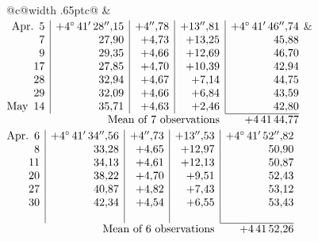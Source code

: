 \noindent\begin{tabular}{@{}c@{\hspace{.4em}\vrule width .65pt\hspace{.4em}}c@{}}
 &
 \\[.18ex]
\(\begin{array}[t]{@{}r|r|r|r|r@{}}
\text{Apr.}\enspace 5 & +4^\circ\,41'\,28''{,}15 & +4''{,}78 & +13''{,}81 & +4^\circ\,41'\,46''{,}74\\
7 & 27{,}90 & +4{,}73 & +13{,}25 & 45{,}88\\
9 & 29{,}35 & +4{,}66 & +12{,}69 & 46{,}70\\
17 & 27{,}85 & +4{,}70 & +10{,}39 & 42{,}94\\
28 & 32{,}94 & +4{,}67 & +7{,}14 & 44{,}75\\
29 & 32{,}09 & +4{,}66 & +6{,}84 & 43{,}59\\
\text{May}\enspace 14 & 35{,}71 & +4{,}63 & +2{,}46 & 42{,}80\\
\cline{5-5}
\multicolumn{4}{r}{\text{Mean of 7 observations}} & +4\,41\,44{,}77
\end{array}\)
&
\(\begin{array}[t]{@{}r|r|r|r|r@{}}
\text{Apr.}\enspace 6 & +4^\circ\,41'\,34''{,}56 & +4''{,}73 & +13''{,}53 & +4^\circ\,41'\,52''{,}82\\
8 & 33{,}28 & +4{,}65 & +12{,}97 & 50{,}90\\
11 & 34{,}13 & +4{,}61 & +12{,}13 & 50{,}87\\
20 & 38{,}22 & +4{,}70 & +9{,}51 & 52{,}43\\
27 & 40{,}87 & +4{,}82 & +7{,}43 & 53{,}12\\
30 & 42{,}34 & +4{,}54 & +6{,}55 & 53{,}43\\
 & & & & \\
\cline{5-5}
\multicolumn{4}{r}{\text{Mean of 6 observations}} & +4\,41\,52{,}26
\end{array}\)
\end{tabular}\par\medskip

